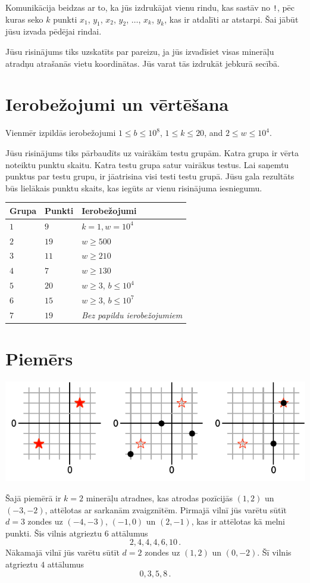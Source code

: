 Komunikācija beidzas ar to, ka jūs izdrukājat vienu rindu, kas sastāv no \texttt{!}, pēc kuras seko $k$ punkti $x_1$, $y_1$, $x_2$, $y_2$, $\ldots$, $x_k$, $y_k$, kas ir atdalīti ar atstarpi.
Šai jābūt jūsu izvada pēdējai rindai.

Jūsu risinājums tiks uzskatīts par pareizu, ja jūs izvadīsiet visas minerāļu atradņu atrašanās vietu koordinātas.
Jūs varat tās izdrukāt jebkurā secībā.

\section*{Ierobežojumi un vērtēšana}

Vienmēr izpildās ierobežojumi
$1\leq b \leq 10^8$, %
$1 \leq k \leq 20$, %
and
$2 \le w \le 10^4$. %

Jūsu risinājums tiks pārbaudīts uz vairākām testu grupām. Katra grupa ir vērta noteiktu punktu skaitu.
Katra testu grupa satur vairākus testus.
Lai saņemtu punktus par testu grupu, ir jāatrisina visi testi testu grupā.
Jūsu gala rezultāts būs lielākais punktu skaits, kas iegūts ar vienu risinājuma iesniegumu.

\medskip
\begin{tabular}{lll}
Grupa & Punkti & Ierobežojumi \\\hline
  $1$ & $9$ & $k = 1, w = 10^4$\\
  $2$ & $19$ & $w \ge 500$\\
  $3$ & $11$ & $w \ge 210$\\
  $4$ & $7$ & $w \ge 130$\\
  $5$ & $20$ & $w \ge 3$, $b \le 10^4$\\
  $6$ & $15$ & $w \ge 3$, $b \le 10^7$\\
  $7$ & $19$ & \emph{Bez papildu ierobežojumiem}
\end{tabular}

\section*{Piemērs}

\includegraphics[width=.6\textwidth]{img/sample1.pdf}

Šajā piemērā ir $k=2$ minerāļu atradnes, kas atrodas pozīcijās $(1,2)$ un $(-3,-2)$, attēlotas ar sarkanām zvaigznītēm.
Pirmajā vilnī jūs varētu sūtīt $d=3$ zondes uz $(-4,-3)$, $(-1, 0)$ un $(2,-1)$, kas ir attēlotas kā melni punkti.
Šis vilnis atgrieztu $6$ attālumus \[
  2, 4, 4, 4, 6, 10\,.
\]
Nākamajā vilnī jūs varētu sūtīt $d=2$ zondes uz $(1,2)$ un $(0,-2)$.
Šī vilnis atgrieztu $4$ attālumus \[
  0, 3, 5, 8\,.
\]